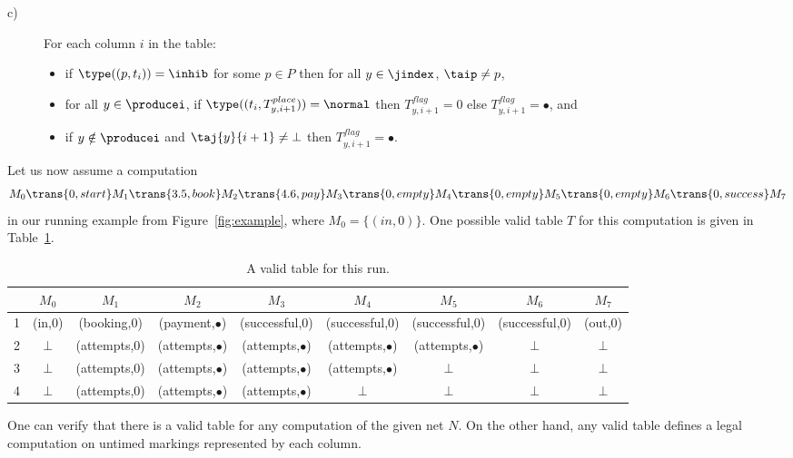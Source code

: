 \begin{definition}
\begin{description}
\item[c)] For each column $i$ in the table:
\begin{itemize}
\item if $\type((p,t_i))=\inhib$ for some $p \in P$ 
then for all $y \in \jindex$, $\taip\neq p$,
\item for all $y \in \producei$, if
${\mathit \type((t_i,T^{place}_{y,i+1}))=\normal}$ 
then ${\mathit T^{flag}_{y,i+1}=0}$ else ${\mathit T^{flag}_{y,i+1}=\bullet}$,
and
\item if $y \notin \producei$ and $\taj{y}{i+1} \neq \bot$ then ${\mathit T^{flag}_{y,i+1}=\bullet}$.
\end{itemize}
\end{description}
\end{definition}
Let us now assume a  computation 
$$M_0 \trans{0,start} M_1 \trans{3.5,book} M_2 \trans{4.6,pay}  
M_3 \trans{0,empty} M_4 \trans{0,empty}  M_5 \trans{0,empty} 
M_6 \trans{0,success}M_7$$ 
in our running example from Figure~\ref{fig:example}, where $M_0=\{(in,0)\}$.
One possible valid table $T$ for this computation is given
in Table~\ref{validtable}.

\begin{table}
\scriptsize
\begin{tabular}{|c|c|c|c|c|c|c|c|c|}
 \hline
 & $M_0$ & $M_1$ & $M_2$ & $M_3$ & $M_4$ & $M_5$ & $M_6$ & $M_7$\\
\hline
1 & (in,0) & (booking,0)   & (payment,$\bullet$) & (successful,0) & (successful,0) & (successful,0) & (successful,0) & (out,0)\\\hline
2 & $\bot$   & (attempts,0) & (attempts,$\bullet$) & (attempts,$\bullet$) & (attempts,$\bullet$) & (attempts,$\bullet$) & $\bot$ & $\bot$\\\hline
3 & $\bot$   & (attempts,0) & (attempts,$\bullet$) & (attempts,$\bullet$) & (attempts,$\bullet$) & $\bot$ & $\bot$ & $\bot$\\\hline
4 & $\bot$   & (attempts,0) & (attempts,$\bullet$) & (attempts,$\bullet$) & $\bot$ & $\bot$ & $\bot$ & $\bot$\\
\hline
\end{tabular}
\vspace{3mm}
\caption{A valid table for this run.}
\vspace{-3mm}
\label{validtable}
\end{table}

One can verify that there is a valid table for any computation of the
given net $N$. On the other hand, any valid table defines a legal computation 
on untimed markings represented by each column.

